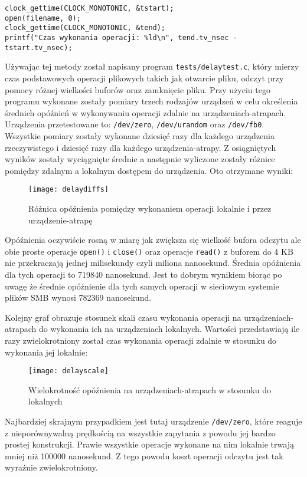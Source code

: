 \documentclass[10pt]{scrartcl}
\begin{document}
\begin{verbatim}
clock_gettime(CLOCK_MONOTONIC, &tstart);
open(filename, 0);
clock_gettime(CLOCK_MONOTONIC, &tend);
printf("Czas wykonania operacji: %ld\n", tend.tv_nsec - tstart.tv_nsec);
\end{verbatim}

Używając tej metody został napisany program \texttt{tests/delaytest.c}, który mierzy czas podstawowych operacji plikowych takich jak otwarcie pliku, odczyt przy pomocy różnej wielkości buforów oraz zamknięcie pliku. Przy użyciu tego programu wykonane zostały pomiary trzech rodzajów urządzeń w celu określenia średnich opóźnień w wykonywaniu operacji zdalnie na urządzeniach-atrapach. Urządzenia przetestowane to: \texttt{/dev/zero}, \texttt{/dev/urandom} oraz \texttt{/dev/fb0}. Wszystkie pomiary zostały wykonane dziesięć razy dla każdego urządzenia rzeczywistego i dziesięć razy dla każdego urządzenia-atrapy. Z osiągniętych wyników zostały wyciągnięte średnie a następnie wyliczone zostały różnice pomiędzy zdalnym a lokalnym dostępem do urządzenia. Oto otrzymane wyniki:

\begin{figure}[H]
    \caption{Różnica opóźnienia pomiędzy wykonaniem operacji lokalnie i przez urządzenie-atrapę}
    \texttt{[image: delaydiffs]}
\end{figure}

Opóźnienia oczywiście rosną w miarę jak zwiększa się wielkość bufora odczytu ale obie proste operacje \texttt{open()} i \texttt{close()} oraz operacje \texttt{read()} z buforem do 4 KB nie przekraczają jednej milisekundy czyli miliona nanosekund. Średnia opóźnienia dla tych operacji to 719840 nanosekund. Jest to dobrym wynikiem biorąc po uwagę że średnie opóźnienie dla tych samych operacji w sieciowym systemie plików SMB wynosi 782369 nanosekund.

Kolejny graf obrazuje stosunek skali czasu wykonania operacji na urządzeniach-atrapach do wykonania ich na urządzeniach lokalnych. Wartości przedstawiają ile razy zwielokrotniony został czas wykonania operacji zdalnie w stosunku do wykonania jej lokalnie:

\begin{figure}[H]
    \caption{Wielokrotność opóźnienia na urządzeniach-atrapach w stosunku do lokalnych}
    \texttt{[image: delayscale]}
\end{figure}

Najbardziej skrajnym przypadkiem jest tutaj urządzenie \texttt{/dev/zero}, które reaguje z nieporównywalną prędkością na wszystkie zapytania z powodu jej bardzo prostej konstrukcji. Prawie wszystkie operacje wykonane na nim lokalnie trwają mniej niż 100000 nanosekund. Z tego powodu koszt operacji odczytu jest tak wyraźnie zwielokrotniony.
\end{document}
